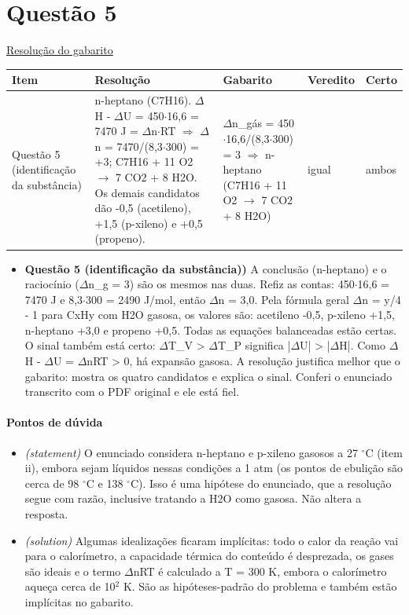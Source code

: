 \documentclass{article}%
\begin{document}
\section*{Questão 5}%
\href{https://poliedroresolve.sistemapoliedro.com.br/vestibulares/ime/2027/ime-2-fase-dia-3-28-10-2026-2-fase-dia-3/dissertativa-5-quimica-2-fase-dia-3-ime-2027}{Resolução do gabarito}\par\smallskip%
\begin{longtable}{@{}p{} p{} p{} p{} p{}@{}}\toprule Item & Resolução & Gabarito & Veredito & Certo \\ \midrule
Questão 5 (identificação da substância) & n{-}heptano (C7H16). $\Delta$H - $\Delta$U = 450$\cdot$16,6 = 7470 J = $\Delta$n$\cdot$RT $\Rightarrow$ $\Delta$n = 7470/(8,3$\cdot$300) = +3; C7H16 + 11 O2 $\to$ 7 CO2 + 8 H2O. Os demais candidatos dão -0,5 (acetileno), +1,5 (p{-}xileno) e +0,5 (propeno). & $\Delta$n\_gás = 450$\cdot$16,6/(8,3$\cdot$300) = 3 $\Rightarrow$ n{-}heptano (C7H16 + 11 O2 $\to$ 7 CO2 + 8 H2O) & igual & ambos \\
\bottomrule\end{longtable}%
\begin{itemize}%
\item%
\textbf{Questão 5 (identificação da substância))} A conclusão (n{-}heptano) e o raciocínio ($\Delta$n\_g = 3) são os mesmos nas duas. Refiz as contas: 450$\cdot$16,6 = 7470 J e 8,3$\cdot$300 = 2490 J/mol, então $\Delta$n = 3,0. Pela fórmula geral $\Delta$n = y/4 - 1 para CxHy com H2O gasosa, os valores são: acetileno -0,5, p{-}xileno +1,5, n{-}heptano +3,0 e propeno +0,5. Todas as equações balanceadas estão certas. O sinal também está certo: $\Delta$T\_V > $\Delta$T\_P significa |$\Delta$U| > |$\Delta$H|. Como $\Delta$H - $\Delta$U = $\Delta$nRT > 0, há expansão gasosa. A resolução justifica melhor que o gabarito: mostra os quatro candidatos e explica o sinal. Conferi o enunciado transcrito com o PDF original e ele está fiel.%
\end{itemize}%
\paragraph{Pontos de dúvida}%
\begin{itemize}%
\item%
\textit{(statement)} O enunciado considera n{-}heptano e p{-}xileno gasosos a 27 $^\circ$C (item ii), embora sejam líquidos nessas condições a 1 atm (os pontos de ebulição são cerca de 98 $^\circ$C e 138 $^\circ$C). Isso é uma hipótese do enunciado, que a resolução segue com razão, inclusive tratando a H2O como gasosa. Não altera a resposta.%
\item%
\textit{(solution)} Algumas idealizações ficaram implícitas: todo o calor da reação vai para o calorímetro, a capacidade térmica do conteúdo é desprezada, os gases são ideais e o termo $\Delta$nRT é calculado a T = 300 K, embora o calorímetro aqueça cerca de 10$^2$ K. São as hipóteses{-}padrão do problema e também estão implícitas no gabarito.%
\end{itemize}%
\end{document}
